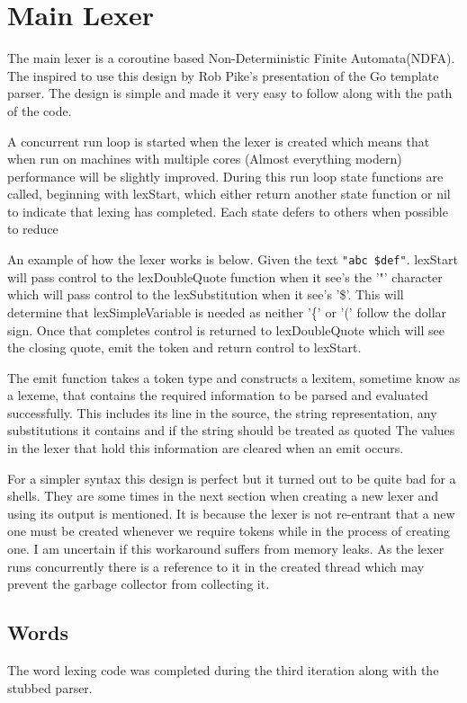 \section{Main Lexer}
The main lexer is a coroutine based Non-Deterministic Finite Automata(NDFA).
The inspired to use this design by Rob Pike's presentation of the Go template parser\cite{PIKE-LEXING-VIDEO}.
The design is simple and made it very easy to follow along with the path of the code.

A concurrent run loop is started when the lexer is created which means that when run on machines with multiple cores (Almost everything modern) performance will be slightly improved.
During this run loop state functions are called, beginning with lexStart, which either return another state function or nil to indicate that lexing has completed. 
Each state defers to others when possible to reduce 

An example of how the lexer works is below.
Given the text \verb!"abc $def"!.
lexStart will pass control to the lexDoubleQuote function when it see's the '"' character which will pass control to the lexSubstitution when it see's '\$'.
This will determine that lexSimpleVariable is needed as neither '\{' or '(' follow the dollar sign.
Once that completes control is returned to lexDoubleQuote which will see the closing quote, emit the token and return control to lexStart.

The emit function takes a token type and constructs a lexitem, sometime know as a lexeme, that contains the required information to be parsed and evaluated successfully.
This includes its line in the source, the string representation, any substitutions it contains and if the string should be treated as quoted
The values in the lexer that hold this information are cleared when an emit occurs.

For a simpler syntax this design is perfect but it turned out to be quite bad for a shells.
They are some times in the next section when creating a new lexer and using its output is mentioned.
It is because the lexer is not re-entrant that a new one must be created whenever we require tokens while in the process of creating one.
I am uncertain if this workaround suffers from memory leaks.
As the lexer runs concurrently there is a reference to it in the created thread which may prevent the garbage collector from collecting it.

\subsection{Words}
The word lexing code was completed during the third iteration along with the stubbed parser.

